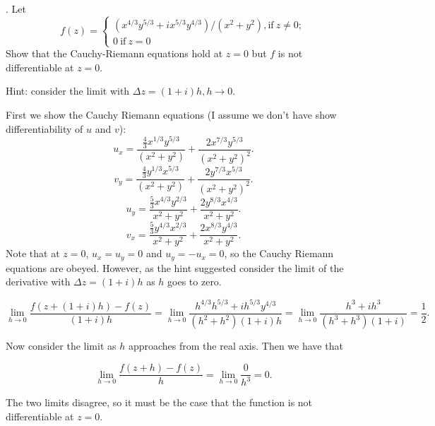 \documentclass[letterpaper, reqno,11pt]{article}
\begin{document}
. Let
$$ f(z) = \left\{\begin{array}{l}
 ( x^{4/3} y^{5/3} + i x^{5/3} y^{4/3})/(x^2+y^2),  \mbox{if} \ z \not =0 ;\\
 0 \ \mbox{if} \ z=0
 \end{array}
 \right.
 $$
 Show that the Cauchy-Riemann equations hold at $z=0$ but $ f$ is not differentiable at $z=0$.

Hint: consider the limit with $\Delta z= (1+i) h, h \to 0$.

\medskip

First we show the Cauchy Riemann equations (I assume we don't have show differentiability of $u$ and $v$): 
\[
u_x=\frac {\frac{4}{3}x^{1 /3}y^{5 /3}}{ (x^2+y^2)}+\frac{2x^{7 /3}y^{5 /3}}{(x^2+y^2)^2}
.\]
\[
v_y=\frac {\frac{4}{3}y^{1 /3}x^{5 /3}}{ (x^2+y^2)}+\frac{2y^{7 /3}x^{5 /3}}{(x^2+y^2)^2}
.\]
\[
u_y=\frac{\frac{5}{3}x^{4 /3}y^{2 /3}}{x^2+y^2}+\frac{2y^{8 /3}x^{4 /3}}{x^2+y^2}
.\]
\[
v_x=\frac{\frac{5}{3}y^{4 /3}x^{2 /3}}{x^2+y^2}+\frac{2x^{8 /3}y^{4 /3}}{x^2+y^2}
.\]
Note that at $z=0$, $u_x=u_y=0$ and $u_y=-u_x=0$, so the Cauchy Riemann equations are obeyed. However, as the hint suggested consider the limit of the derivative with $\Delta z=(1+i)h$ as $h$ goes to zero. 

\[
\lim_{h \to 0}\frac{f(z+(1+i)h)-f(z)}{(1+i)h}=\lim_{h \to 0}\frac{h^{4 /3}h^{5 /3}+ih^{5 /3}y^{4 /3}}{(h^2+h^2)(1+i)h}=\lim_{h \to 0}\frac{h^3+ih^3}{(h^3+h^3)(1+i)}=\frac{1}{2}
.\]

Now consider the limit as $h$ approaches from the real axis. Then we have that 

\[
\lim_{h \to 0}\frac{f(z+h)-f(z)}{h}=\lim_{h \to 0}\frac{0}{h^3}=0
.\]

The two limits disagree, so it must be the case that the function is not differentiable at $z=0$. 
\end{document}

